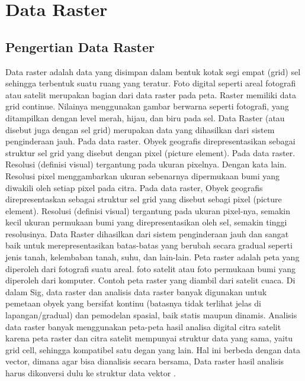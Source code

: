 
\section{Data Raster}
\subsection{Pengertian Data Raster}
Data raster \cite{puntodewo2003sistem} adalah data yang disimpan dalam bentuk kotak segi empat (grid) sel sehingga terbentuk suatu ruang yang 
teratur. Foto digital seperti areal fotografi atau satelit merupakan bagian dari data raster pada peta. 
Raster memiliki data grid continue. Nilainya menggunakan gambar berwarna seperti fotografi, yang ditampilkan dengan 
level merah, hijau, dan biru pada sel. Data Raster (atau disebut juga dengan sel grid) merupakan data yang 
dihasilkan dari sistem penginderaan jauh. Pada data raster. Obyek geografis direpresentasikan sebagai struktur
sel grid yang disebut dengan pixel (picture element). Pada data raster. Resolusi (definisi visual) tergantung
pada ukuran pixelnya. Dengan kata lain. Resolusi pixel menggambarkan ukuran sebenarnya dipermukaan bumi 
yang diwakili oleh setiap pixel pada citra. Pada data raster, Obyek geografis direpresentaskan sebagai struktur sel grid yang disebut sebagi pixel (picture element). Resolusi (definisi visual) tergantung pada ukuran pixel-nya, semakin kecil ukuran permukaan bumi yang direpresentasikan oleh sel, semakin tinggi resolusinya. Data Raster dihasilkan dari sistem penginderaan jauh dan sangat baik untuk merepresentasikan batas-batas yang berubah secara gradual seperti jenis tanah, kelembaban tanah, suhu, dan lain-lain. Peta raster adalah peta yang diperoleh dari fotografi suatu areal. foto satelit atau foto permukaan bumi yang diperoleh dari komputer. Contoh peta raster yang diambil dari satelit cuaca. Di dalam Sig, data raster dan analisis data raster banyak digunakan untuk pemetaan obyek yang bersifat kontinu (batasnya tidak terlihat jelas di lapangan/gradual) dan pemodelan spasial, baik statis maupun dinamis. Analisis data raster banyak menggunakan peta-peta hasil analisa digital citra satelit karena peta raster dan citra satelit mempunyai struktur data yang sama, yaitu grid cell, sehingga kompatibel satu degan yang lain. Hal ini berbeda dengan data vector, dimana agar bisa dianalisis secara bersama, Data raster hasil analisis harus dikonversi dulu ke struktur data vektor \cite{puntodewo2003sistem}.

